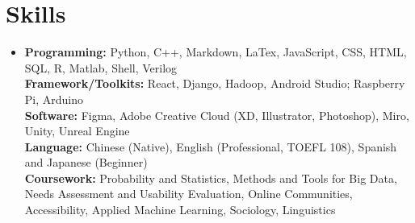 \resumeSubHeadingListEnd
\vspace{-5mm}
\section{\textbf{Skills}}
\vspace{1mm}
 \begin{itemize}[leftmargin=0.05in, label={}]
\item \textbf{Programming: }{Python, C++, Markdown, LaTex, JavaScript, CSS, HTML, SQL, R, Matlab, Shell, Verilog} \\
\textbf{Framework/Toolkits: }{React, Django, Hadoop, Android Studio; Raspberry Pi, Arduino}\\
\textbf{Software: }Figma, Adobe Creative Cloud (XD, Illustrator, Photoshop), Miro, Unity, Unreal Engine\\
\textbf{Language: }Chinese (Native), English (Professional, TOEFL 108), Spanish and Japanese (Beginner)\\
\textbf{Coursework: }Probability and Statistics, Methods and Tools for Big Data, Needs Assessment and Usability Evaluation, Online Communities, Accessibility, Applied Machine Learning, Sociology, Linguistics




    
 \end{itemize}
 \vspace{-16pt}